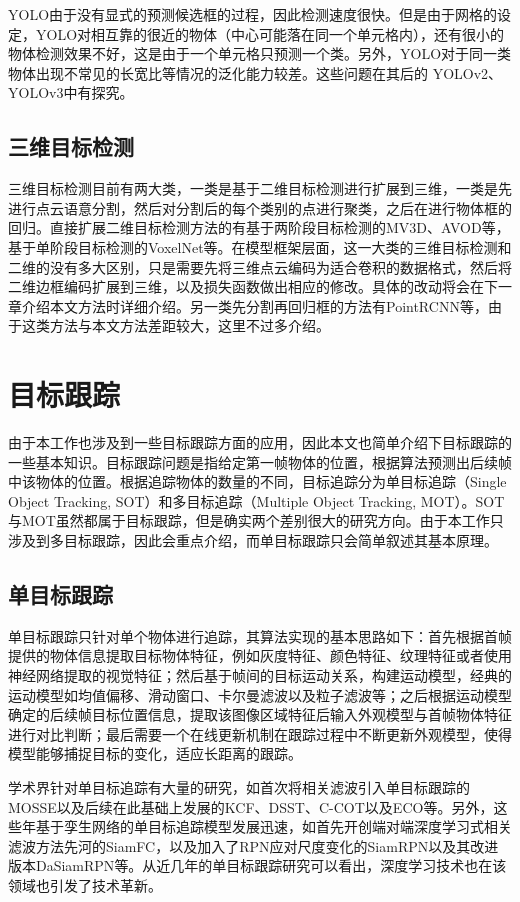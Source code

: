 YOLO由于没有显式的预测候选框的过程，因此检测速度很快。但是由于网格的设定，YOLO对相互靠的很近的物体（中心可能落在同一个单元格内），还有很小的物体检测效果不好，这是由于一个单元格只预测一个类。另外，YOLO对于同一类物体出现不常见的长宽比等情况的泛化能力较差。这些问题在其后的 YOLOv2、YOLOv3中有探究。

\subsection{三维目标检测}
\label{3d_detection}
三维目标检测目前有两大类，一类是基于二维目标检测进行扩展到三维，一类是先进行点云语意分割，然后对分割后的每个类别的点进行聚类，之后在进行物体框的回归。直接扩展二维目标检测方法的有基于两阶段目标检测的MV3D、AVOD等，基于单阶段目标检测的VoxelNet等。在模型框架层面，这一大类的三维目标检测和二维的没有多大区别，只是需要先将三维点云编码为适合卷积的数据格式，然后将二维边框编码扩展到三维，以及损失函数做出相应的修改。具体的改动将会在下一章介绍本文方法时详细介绍。另一类先分割再回归框的方法有PointRCNN等，由于这类方法与本文方法差距较大，这里不过多介绍。


\section{目标跟踪}
\label{object_tracking}
由于本工作也涉及到一些目标跟踪方面的应用，因此本文也简单介绍下目标跟踪的一些基本知识。目标跟踪问题是指给定第一帧物体的位置，根据算法预测出后续帧中该物体的位置。根据追踪物体的数量的不同，目标追踪分为单目标追踪（Single Object Tracking, SOT）和多目标追踪（Multiple Object Tracking, MOT）。SOT与MOT虽然都属于目标跟踪，但是确实两个差别很大的研究方向。由于本工作只涉及到多目标跟踪，因此会重点介绍，而单目标跟踪只会简单叙述其基本原理。

\subsection{单目标跟踪}
\label{single_tracking}
单目标跟踪只针对单个物体进行追踪，其算法实现的基本思路如下：首先根据首帧提供的物体信息提取目标物体特征，例如灰度特征、颜色特征、纹理特征或者使用神经网络提取的视觉特征；然后基于帧间的目标运动关系，构建运动模型，经典的运动模型如均值偏移、滑动窗口、卡尔曼滤波以及粒子滤波等；之后根据运动模型确定的后续帧目标位置信息，提取该图像区域特征后输入外观模型与首帧物体特征进行对比判断；最后需要一个在线更新机制在跟踪过程中不断更新外观模型，使得模型能够捕捉目标的变化，适应长距离的跟踪。

学术界针对单目标追踪有大量的研究，如首次将相关滤波引入单目标跟踪的MOSSE\cite{bolme2010visual}以及后续在此基础上发展的KCF\cite{henriques2014high}、DSST\cite{danelljan2014accurate}、C-COT\cite{danelljan2016beyond}以及ECO\cite{danelljan2017eco}等。另外，这些年基于孪生网络的单目标追踪模型发展迅速，如首先开创端对端深度学习式相关滤波方法先河的SiamFC\cite{bertinetto2016fully}，以及加入了RPN应对尺度变化的SiamRPN\cite{li2018high}以及其改进版本DaSiamRPN\cite{zhu2018distractor}等。从近几年的单目标跟踪研究可以看出，深度学习技术也在该领域也引发了技术革新。


